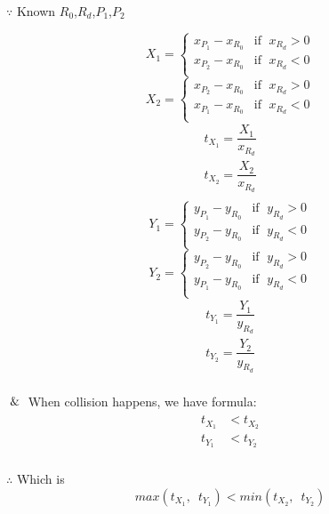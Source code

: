 $\because$ Known $R_0$,\enspace$R_d$,\enspace$P_1$,\enspace$P_2$
\begin{multicols}{2}
\noindent
\[
X_1 =
\begin{cases}
x_{P_1} - x_{R_0} & \text{if }\;x_{R_d} > 0\\
x_{P_2} - x_{R_0} & \text{if }\;x_{R_d} < 0\\
\end{cases}
\]
\[
X_2 =
\begin{cases}
x_{P_2} - x_{R_0} & \text{if }\;x_{R_d} > 0\\
x_{P_1} - x_{R_0} & \text{if }\;x_{R_d} < 0\\
\end{cases}
\]
\[
\begin{array}{lr}
t_{X_1} = \dfrac{X_1}{x_{R_d}}\\
t_{X_2} = \dfrac{X_2}{x_{R_d}}\\
\end{array}
\]
\columnbreak
\[
Y_1 =
\begin{cases}
y_{P_1} - y_{R_0} & \text{if }\;y_{R_d} > 0\\
y_{P_2} - y_{R_0} & \text{if }\;y_{R_d} < 0\\
\end{cases}
\]
\[
Y_2 =
\begin{cases}
y_{P_2} - y_{R_0} & \text{if }\;y_{R_d} > 0\\
y_{P_1} - y_{R_0} & \text{if }\;y_{R_d} < 0\\
\end{cases}
\]
\[
\begin{array}{lr}
t_{Y_1} = \dfrac{Y_1}{y_{R_d}}\\
t_{Y_2} = \dfrac{Y_2}{y_{R_d}}\\
\end{array}
\]
\end{multicols}

$\And$ When collision happens,  we have formula:
\[
\begin{array}{lr}
\begin{aligned}
t_{X_1} &< t_{X_2}\\
t_{Y_1} &< t_{Y_2}\\
\end{aligned}
\end{array}
\]

$\therefore$ Which is
\begin{equation}
\label{equ:ray-box-2d-intersection}
max(t_{X_1},\enspace t_{Y_1}) < min(t_{X_2},\enspace t_{Y_2})
\end{equation}

